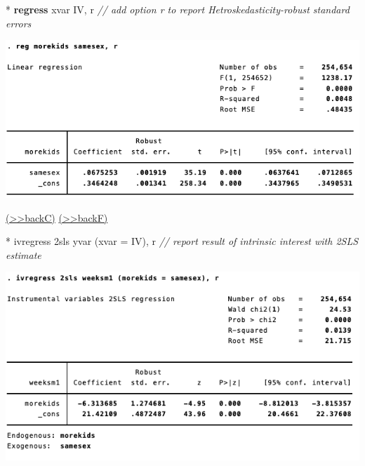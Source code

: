 \documentclass[
  10pt,
  ignorenonframetext,
]{beamer}
\newenvironment{Shaded}{\begin{snugshade}}{\end{snugshade}}
\newcommand{\CommentTok}[1]{\textcolor[rgb]{0.56,0.35,0.01}{\textit{#1}}}
\newcommand{\FunctionTok}[1]{\textcolor[rgb]{0.00,0.00,0.00}{#1}}
\newcommand{\KeywordTok}[1]{\textcolor[rgb]{0.13,0.29,0.53}{\textbf{#1}}}
\newcommand{\NormalTok}[1]{#1}
\begin{document}
\begin{frame}[fragile]{}
\protect\hypertarget{res2-regFirstStage}{}
\small

\begin{Shaded}
\begin{Highlighting}[]
\NormalTok{* }\KeywordTok{regress}\NormalTok{ xvar IV, }\FunctionTok{r}
\CommentTok{// add option r to report Hetroskedasticity{-}robust standard errors}
\end{Highlighting}
\end{Shaded}

\begin{center}\includegraphics[width=1\linewidth]{pictures/res2-regFirstStage} \end{center}

\footnotesize \protect\hyperlink{q2-regFirstStage}{(\textgreater\textgreater backC)}
\normalsize
\footnotesize \protect\hyperlink{IVestatFirstStage}{(\textgreater\textgreater backF)}
\normalsize
\end{frame}

\begin{frame}[fragile]{}
\protect\hypertarget{section}{}
\small

\begin{Shaded}
\begin{Highlighting}[]
\NormalTok{* ivregress 2sls yvar (xvar = IV), }\FunctionTok{r}
\CommentTok{// report result of intrinsic interest with 2SLS estimate}
\end{Highlighting}
\end{Shaded}

\begin{center}\includegraphics[width=1\linewidth]{pictures/res3-ivregress} \end{center}
\end{frame}
\end{document}
